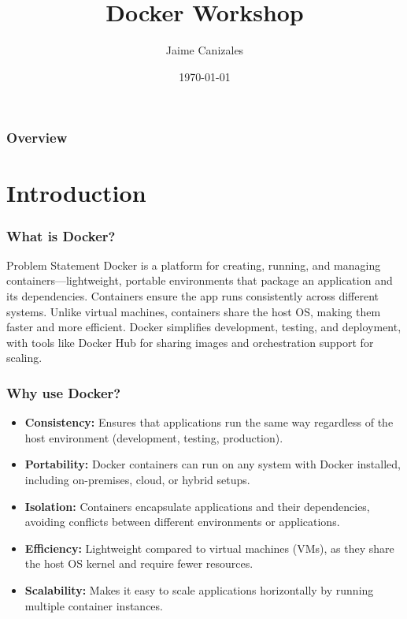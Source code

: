 \documentclass{beamer}
\title[Docker Workshop]{Docker Workshop}
\author{Jaime Canizales}
\institute[Hunter College] 
{
City University of New York \\ 
\medskip
\textit{jaime.canizales@hunter.cuny.edu} 
}
\date{\today}
\begin{document}
\begin{frame}
\titlepage 
\end{frame}


\begin{frame} \frametitle{Overview} 
\tableofcontents
\end{frame}


\section{Introduction}
\begin{frame}\frametitle{What is Docker?}
\begin{block}{Problem Statement}
Docker is a platform for creating, running, and managing containers—lightweight,
portable environments that package an application and its dependencies. 
Containers ensure the app runs consistently across different systems. Unlike 
virtual machines, containers share the host OS, making them faster and more 
efficient. Docker simplifies development, testing, and deployment, with tools
like Docker Hub for sharing images and orchestration support for scaling.
\end{block}
\end{frame}


\begin{frame}\frametitle{Why use Docker?}
\begin{itemize}
\item \textbf{Consistency:} Ensures that applications run the same way regardless of the host environment (development, testing, production).
\item \textbf{Portability:} Docker containers can run on any system with Docker installed, including on-premises, cloud, or hybrid setups.
\item \textbf{Isolation:} Containers encapsulate applications and their dependencies, avoiding conflicts between different environments or applications.
\item \textbf{Efficiency:} Lightweight compared to virtual machines (VMs), as they share the host OS kernel and require fewer resources.
\item \textbf{Scalability:} Makes it easy to scale applications horizontally by running multiple container instances.
\end{itemize}
\end{frame}
\end{document}
